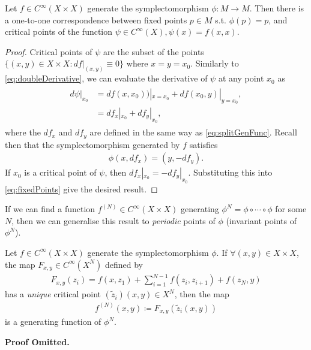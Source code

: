 \documentclass[11pt, final]{article}
\begin{document}
\begin{prop}
	Let $f \in C^\infty(X\times X)$ generate the symplectomorphism $\phi: M \to M$. Then there is a one-to-one correspondence between fixed points $p \in M$ s.t. $\phi(p) = p$, and critical points of the function $\psi \in C^\infty(X), \psi(x) = f(x,x)$.
\end{prop}
\begin{proof}
	Critical points of $\psi$ are the subset of the points $\{ (x,y) \in X \times X : df|_{(x,y)} \equiv 0 \}$ where $x=y=x_0$. Similarly to \eqref{eq:doubleDerivative}, we can evaluate the derivative of $\psi$ at any point $x_0$ as
		\begin{align}
			\begin{split}
				d \psi|_{x_0} &= df(x,x_0))|_{x=x_0} + df(x_0,y)|_{y=x_0},\\
							  &= df_x|_{x_0} + df_y|_{x_0},
			\end{split}
		\end{align}
	where the $df_x$ and $df_y$ are defined in the same way as \eqref{eq:splitGenFunc}. Recall then that the symplectomorphism generated by $f$ satisfies
		\begin{align}\label{eq:fixedPoints}
			\phi(x, df_x) = (y, -df_y).
		\end{align}
	If $x_0$ is a critical point of $\psi$, then $df_x|_{x_0} = -df_y|_{x_0}$. Substituting this into \eqref{eq:fixedPoints} give the desired result.
\end{proof}
\begin{remark}
	If we can find a function $f^{(N)} \in C^\infty(X \times X)$ generating $\phi^N = \phi \circ \cdots \circ \phi$ for some $N$, then we can generalise this result to \textit{periodic} points of $\phi$ (invariant points of $\phi^N$).
\end{remark}

\begin{prop}
	Let $f \in C^\infty(X \times X)$ generate the symplectomorphism $\phi$. If $ \forall (x,y) \in X \times X$, the map $F_{x,y} \in  C^\infty(X^N)$ defined by
		\begin{align}
			F_{x,y}(z_i) = f(x,z_1) + \sum_{i=1}^{N-1} f(z_i, z_{i+1}) + f(z_N, y)
		\end{align}
	has a \textit{unique} critical point $(\tilde{z}_i)(x,y) \in X^N$, then the map
		\begin{align}
			f^{(N)}(x,y) \coloneqq F_{x,y}(\tilde{z}_i(x,y))
		\end{align}
	is a generating function of $\phi^N$.
\end{prop}
\textbf{Proof Omitted.}
\end{document}
